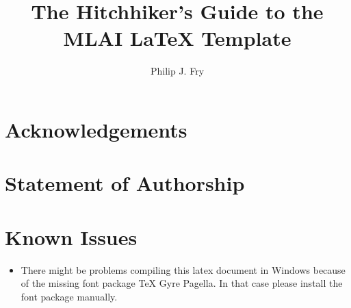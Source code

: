 \documentclass[ba,logo]{mlai-thesis}
\title{The Hitchhiker's Guide to the MLAI \LaTeX{} Template}
\author{Philip J. Fry\\\birthinfo{August 14, 1974 in Brooklyn, New York}}
\begin{document}
	
	\frontmatter 
	
	\maketitle 
	
	\cleardoublepage
	\begin{abstract}
		\blindtext[3]
	\end{abstract}

	\chapter*{Acknowledgements}  
	
	\cleardoublepage
	\chapter*{Statement of Authorship} 
	 
	
	\cleardoublepage
	\tableofcontents
	
	
	\mainmatter
	
	 
	
	
	
	 
	
	
	
	 
	
	 
	
	\begingroup 
	
	\backmatter
		
	\printbibliography[heading=bibintoc]
	
	\listoffigures
	
	\listoftables
	
	\endgroup 
	
	\appendix
	
	\chapter{Known Issues}  
	\begin{itemize}
	\item There might be problems compiling this latex document in Windows because of the missing font package TeX Gyre Pagella. In that case please install the font package manually.
	\end{itemize}
	
	
\end{document}
